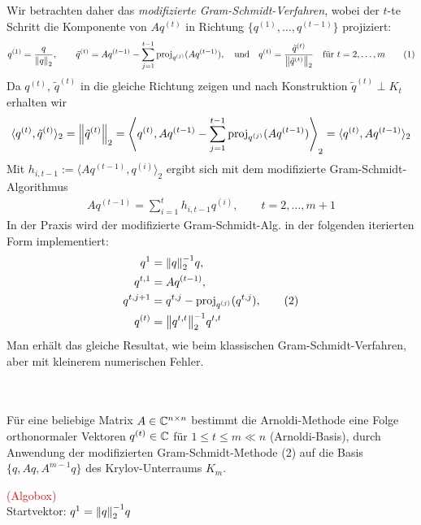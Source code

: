 Wir betrachten daher das \textit{modifizierte Gram-Schmidt-Verfahren}, wobei der $t$-te Schritt die Komponente
von $Aq^{(t)}$ in Richtung $\{q^{(1)},\dots,q^{(t-1)}\}$ projiziert:
%
\begin{align*}
  q^{(1)} = \dfrac{q}{\vertn{2}{q}_2},
  \qquad 
  \tilde{q}^{(t)} = Aq^{(t-1)} - \sum_{j=1}^{t-1} \text{proj}_{q^{(j)}}(Aq^{(t-1)}), 
  \quad\text{und}\quad
  q^{(t)} = \dfrac{\tilde{q}^{(t)}}{\vertn{2}{\tilde{q}^{(t)}}_2}\quad\text{für } t=2,\dots,m \tag{1}
\end{align*}
%
Da $q^{(t)}$, $\tilde{q}^{(t)}$ in die gleiche Richtung zeigen 
und nach Konstruktion $\tilde{q}^{(t)}\perp K_t$ erhalten wir
% 
\begin{align*}
  \langle q^{(t)}, \tilde{q}^{(t)}\rangle_2 
  = \vertn{2}{\tilde{q}^{(t)}}_2 
  = \left\langle q^{(t)},Aq^{(t-1)} - \sum_{j=1}^{t-1} \text{proj}_{q^{(j)}}(Aq^{(t-1)})\right\rangle _2 
  = \langle q^{(t)}, Aq^{(t-1)}\rangle_2
\end{align*}
%
Mit $h_{i,t-1} := \langle Aq^{(t-1)},q^{(i)} \rangle_2$ ergibt sich mit dem modifizierte Gram-Schmidt-Algorithmus
\begin{align*}Aq^{(t-1)}=\sum_{i=1}^{t} h_{i,t-1 }q^{(i)}, \qquad t=2,\dots,m+1\end{align*}
In der Praxis wird der modifizierte Gram-Schmidt-Alg. in der folgenden iterierten Form implementiert:
\begin{align*}
  q^1 &= \vertn{2}{q}_2^{-1}q, \\
  q^{t,1}&=Aq^{(t-1)}, \\
  q^{t,j+1}&=q^{t,j}-\text{proj}_{q^{(j)}}(q^{t,j}), \tag{2}\\
  q^{(t)}&=\vertn{2}{q^{t,t}}_2^{-1}q^{t,t}
\end{align*}
Man erhält das gleiche Resultat, wie beim klassischen Gram-Schmidt-Verfahren, aber mit kleinerem numerischen Fehler. \\ \\
\begin{defbox} \ \\
  Für eine beliebige Matrix $A\in\mathbb C  ^{n\times n}$ bestimmt die Arnoldi-Methode eine Folge orthonormaler 
  Vektoren $q^{(t)}\in\mathbb C  $ für $1\leq t \leq m \ll n$ (Arnoldi-Basis), durch Anwendung der modifizierten 
  Gram-Schmidt-Methode (2) auf die Basis $\{q,Aq,A^{m-1}q\}$ des Krylov-Unterraums $K_m$.
\end{defbox}
\textcolor{red}{(Algobox)} \\
Startvektor: $q^1=\vertn{2}{q}^{-1}_2 q$ \\

